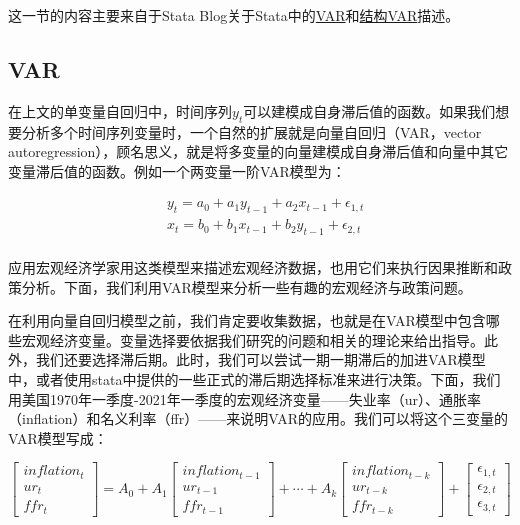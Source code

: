 \documentclass[cn,12pt,math=newtx,citestyle=gb7714-2015,bibstyle=gb7714-2015]{elegantbook}
\begin{document}
	这一节的内容主要来自于Stata Blog关于Stata中的\href{https://blog.stata.com/2016/08/09/vector-autoregressions-in-stata/}{VAR}和\href{https://blog.stata.com/2016/09/20/structural-vector-autoregression-models/}{结构VAR}描述。
	
	\subsection{VAR}
	
	在上文的单变量自回归中，时间序列$y_t$可以建模成自身滞后值的函数。如果我们想要分析多个时间序列变量时，一个自然的扩展就是向量自回归（VAR，vector autoregression），顾名思义，就是将多变量的向量建模成自身滞后值和向量中其它变量滞后值的函数。例如一个两变量一阶VAR模型为：
	

		\begin{align*}
		&	y_t =a_0 +a_1 y_{t-1} +a_2 x_{t-1} +\epsilon_{1,t} \\
		&   x_t =b_0 +b_1 x_{t-1} +b_2 y_{t-1}+\epsilon_{2,t}\\	
		\end{align*}
    
    应用宏观经济学家用这类模型来描述宏观经济数据，也用它们来执行因果推断和政策分析。下面，我们利用VAR模型来分析一些有趣的宏观经济与政策问题。
    
    在利用向量自回归模型之前，我们肯定要收集数据，也就是在VAR模型中包含哪些宏观经济变量。变量选择要依据我们研究的问题和相关的理论来给出指导。此外，我们还要选择滞后期。此时，我们可以尝试一期一期滞后的加进VAR模型中，或者使用stata中提供的一些正式的滞后期选择标准来进行决策。下面，我们用美国1970年一季度-2021年一季度的宏观经济变量——失业率（ur）、通胀率（inflation）和名义利率（ffr）——来说明VAR的应用。我们可以将这个三变量的VAR模型写成：
    
    \begin{equation}
    	\left[
    	\begin{array}{c}
    		inflation_t \\
    		ur_t \\
    		ffr_t 
    	\end{array}
    	\right]
    	=A_0 +A_1
    	\left[
    	\begin{array}{c}
    	inflation_{t-1} \\
    	ur_{t-1} \\
    	ffr_{t-1} 
    		\end{array}
    	\right]
    	+ \cdots+A_k
    	\left[
    	\begin{array}{c}
    	inflation_{t-k} \\
    	ur_{t-k} \\
    	ffr_{t-k} 
    \end{array}
    	\right]
    	+
    	\left[
    	\begin{array}{c}
    	\epsilon_{1,t} \\
    	\epsilon_{2,t} \\
    	\epsilon_{3,t} 
    \end{array}
    	\right]
    \end{equation}
    
\end{document}
